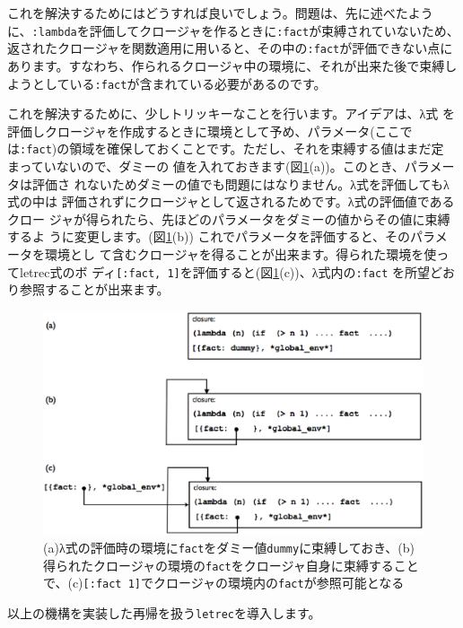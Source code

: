 これを解決するためにはどうすれば良いでしょう。問題は、先に述べたように、{\tt :lambda}を評価してクロージャを作るときに{\tt :fact}が束縛されていないため、返されたクロージャを関数適用に用いると、その中の{\tt :fact}が評価できない点にあります。すなわち、作られるクロージャ中の環境に、それが出来た後で束縛しようとしている{\tt :fact}が含まれている必要があるのです。

これを解決するために、少しトリッキーなことを行います。アイデアは、λ式
を評価しクロージャを作成するときに環境として予め、パラメータ(ここで
は{\tt :fact})の領域を確保しておくことです。ただし、それを束縛する値はまだ定
まっていないので、ダミーの
値を入れておきます(図\ref{fig:letrec}(a))。このとき、パラメータは評価さ
れないためダミーの値でも問題にはなりません。λ式を評価してもλ式の中は
評価されずにクロージャとして返されるためです。λ式の評価値であるクロー
ジャが得られたら、先ほどのパラメータをダミーの値からその値に束縛するよ
うに変更します。(図\ref{fig:letrec}(b))
これでパラメータを評価すると、そのパラメータを環境とし
て含むクロージャを得ることが出来ます。得られた環境を使ってletrec式のボ
ディ{\tt [:fact, 1]}を評価すると(図\ref{fig:letrec}(c))、λ式内の{\tt :fact}
を所望どおり参照することが出来ます。

\begin{figure}[htbp]
\begin{center}
\includegraphics[width=140mm]{images/letrec.eps}
\end{center}
\caption{(a)λ式の評価時の環境に{\tt fact}をダミー値{\tt dummy}に束縛しておき、(b)得られたクロージャの環境の{\tt fact}をクロージャ自身に束縛することで、(c){\tt [:fact 1]}でクロージャの環境内の{\tt fact}が参照可能となる}
\label{fig:letrec}
\end{figure}


以上の機構を実装した再帰を扱う{\tt letrec}を導入します。

